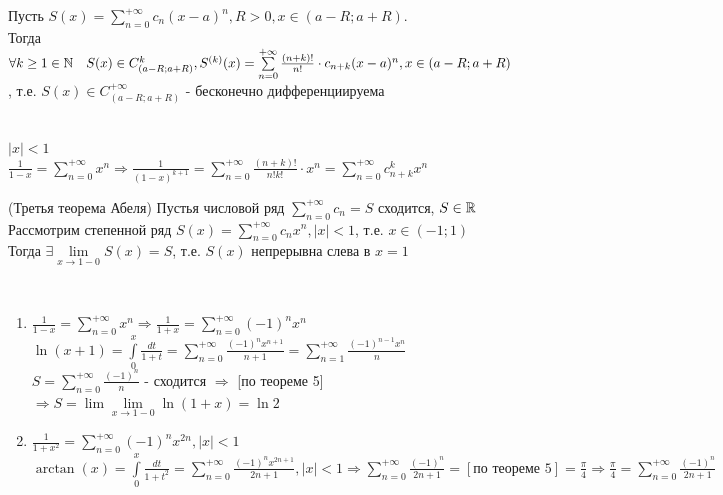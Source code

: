 \begin{Seq}
	Пусть $S(x) = \sum\limits_{n=0}^{+\infty}c_n(x-a)^n, R > 0, x \in (a-R;a+R)$.\\
	Тогда $\forall k \geq 1 \in \mathbb{N} \quad S(x) \in C_{(a-R;a+R)}^{k}, S^{(k)}(x) = \sum\limits_{n=0}^{+\infty} \frac{(n+k)!}{n!}\cdot c_{n+k}(x-a)^n, x \in (a-R;a+R)$, т.е. 
	$S(x) \in C_{(a-R;a+R)}^{+\infty}$ - бесконечно дифференциируема
\end{Seq}

\begin{Example}~\\
	$|x| < 1$\\
	$\frac{1}{1-x} = \sum\limits_{n = 0}^{+\infty}x^n \Rightarrow \frac{1}{(1-x)^{k+1}} = \sum\limits_{n=0}^{+\infty}\frac{(n+k)!}{n!k!}\cdot x^n = \sum\limits_{n=0}^{+\infty}c_{n+k}^{k}x^n$
\end{Example}

\begin{Th}(Третья теорема Абеля)
	Пустья числовой ряд $\sum\limits_{n=0}^{+\infty}c_n = S$ сходится, $S \in \mathbb{R}$\\
	Рассмотрим степенной ряд $S(x) = \sum\limits_{n=0}^{+\infty}c_n x^n, |x| < 1$, т.е. $x \in (-1;1)$\\
	Тогда $\exists \lim\limits_{x \to 1-0}S(x) = S$, т.е. $S(x)$ непрерывна слева в $x = 1$
\end{Th}

\begin{Example}~\\
	\begin{enumerate}
		\item $\frac{1}{1-x} = \sum\limits_{n = 0}^{+\infty}x^n \Rightarrow \frac{1}{1+x} = \sum\limits_{n = 0}^{+\infty}(-1)^nx^n$\\
		$\ln(x+1) = \int\limits_{0}^{x}\frac{dt}{1+t} = \sum\limits_{n=0}^{+\infty}\frac{(-1)^nx^{n+1}}{n+1} = \sum\limits_{n=1}^{+\infty}\frac{(-1)^{n-1} x^n}{n}$\\
		$S = \sum\limits_{n=0}^{+\infty}\frac{(-1)^n}{n}$ - сходится $\Rightarrow$ [по теореме 5] $\Rightarrow S = \lim\lim\limits_{x \to 1 - 0}\ln(1+x) = \ln 2$
		\item $\frac{1}{1+x^2} = \sum\limits_{n = 0}^{+\infty}(-1)^n x^{2n}, |x| < 1$\\
		$\arctan(x) = \int\limits_{0}^{x}\frac{dt}{1+t^2} = \sum\limits_{n=0}^{+\infty}\frac{(-1)^n x^{2n+1}}{2n+1}, |x| < 1 \Rightarrow \sum\limits_{n=0}^{+\infty}\frac{(-1)^n}{2n+1} = [\text{по теореме 5}] = \frac{\pi}{4} \Rightarrow \frac{\pi}{4} = \sum\limits_{n=0}^{+\infty}\frac{(-1)^n}{2n+1}$
	\end{enumerate}
\end{Example}